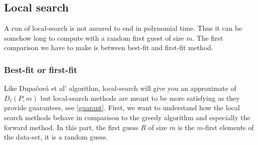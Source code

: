 \documentclass{amsart}
\begin{document}
\subsection{Local search}
A run of local-search is not assured to end in polynomial time. Thus it can be somehow long to compute with a random first guest of size $m$. The first comparison we have to make is between best-fit and first-fit method.
\subsubsection{Best-fit or first-fit}
Like Dupačová et al' algorithm, local-search will give you an approximate of $D_\ell\left(P,m\right)$ but local-search methods are meant to be more satisfying as they provide guarantees, see \ref{guarant}. First, we want to understand how the local search methods behave in comparison to the greedy algorithm and especially the forward method. In this part, the first guess $R$ of size $m$ is the $m$-first elements of the data-set, it is a random guess.
\end{document}
